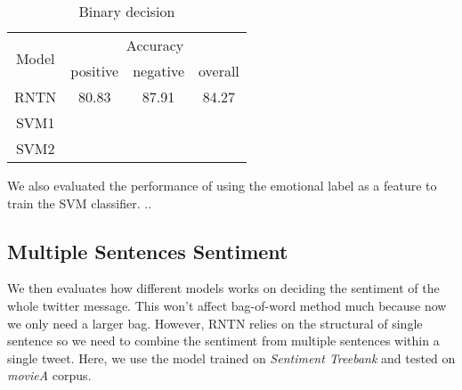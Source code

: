 \begin{table}[H]
  \begin{center}
    \begin{tabular}{cccc}\hline
      \multirow{2}{*}{Model} 
      & \multicolumn{3}{c}{Accuracy} \\\cline{2-4}
    & positive & negative & overall \\ \hline
    RNTN  & 80.83      &   87.91   &  84.27      \\ 
    SVM1  & ~        &          &         \\ 
    SVM2  & ~        &          &         \\ \hline
    \end{tabular}
    \end{center}
    \caption{\label{exp1_1} Binary decision}
\end{table}

We also evaluated the performance of using the emotional label as a feature to train the SVM classifier. ..


\subsection{Multiple Sentences Sentiment}
We then evaluates how different models works on deciding the sentiment of the whole twitter message. This won't affect bag-of-word method much because now we only need a larger bag. However, RNTN relies on the structural of single sentence so we need to combine the sentiment from multiple sentences within a single tweet. Here, we use the model trained on \textit{Sentiment Treebank} and tested on \textit{movieA} corpus. 

